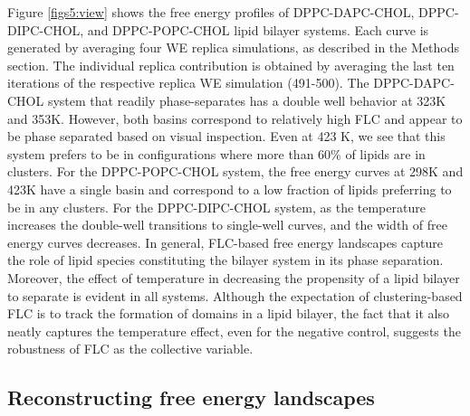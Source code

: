\documentclass{biophys-new}
\begin{document}
Figure \ref{figs5:view} shows the free energy profiles of DPPC-DAPC-CHOL, DPPC-DIPC-CHOL, and DPPC-POPC-CHOL lipid bilayer systems.
Each curve is generated by averaging four WE replica simulations, as described in the Methods section.
The individual replica contribution is obtained by averaging the last ten iterations of the respective replica WE simulation (491-500). 
The DPPC-DAPC-CHOL system that readily phase-separates has a double well behavior at 323K and 353K.
However, both basins correspond to relatively high FLC and appear to be phase separated based on visual inspection.
Even at 423 K, we see that this system prefers to be in configurations where more than 60\% of lipids are in clusters.
For the DPPC-POPC-CHOL system, the free energy curves at 298K and 423K have a single basin and correspond to a low fraction of lipids preferring to be in any clusters.
For the DPPC-DIPC-CHOL system, as the temperature increases the double-well transitions to single-well curves, and the width of free energy curves decreases.
In general, FLC-based free energy landscapes capture the role of lipid species constituting the bilayer system in its phase separation.
Moreover, the effect of temperature in decreasing the propensity of a lipid bilayer to separate is evident in all systems.
Although the expectation of clustering-based FLC is to track the formation of domains in a lipid bilayer, the fact that it also neatly captures the temperature effect, even for the negative control, suggests the robustness of FLC as the collective variable.

\subsection*{Reconstructing free energy landscapes}
\end{document}
